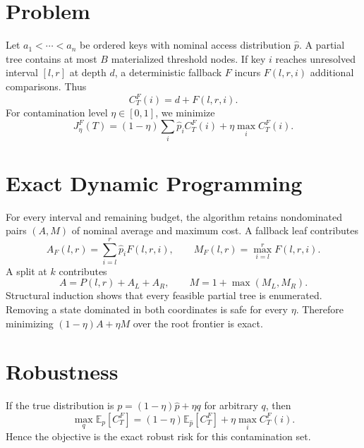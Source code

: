 \documentclass[10pt]{article}
\begin{document}
\begin{abstract}
The proof-carrying DSL adds canonical algebraic capability declarations,
retains every typed design even when ineligible, binds the selected runtime and
generated C++ to one digest, and independently regenerates the complete typed
grammar before accepting the embedded AutoIndex proof.
As a representation-aware synthesis case, CertiGap-H exactly selects
nonuniform two-level-prefix partitions for range sums and point updates. This
is exact optimization inside an explicitly programmed representation grammar,
not unconstrained discovery of a previously unknown data structure. Its
dynamic program and replay verifier use deterministic fixed-point score units.
For nonstationary operation streams, TrackingAutoIndex runs the causal Work
Function Algorithm over the feasible portfolio, pays explicit representation
migration cost, and reports exact ex-post regret against a dynamic-programming
$K$-switch oracle.
\end{abstract}

\section{Problem}
Let $a_1<\cdots<a_n$ be ordered keys with nominal access distribution
$\hat p$. A partial tree contains at most $B$ materialized threshold nodes.
If key $i$ reaches unresolved interval $[l,r]$ at depth $d$, a deterministic
fallback $F$ incurs $F(l,r,i)$ additional comparisons. Thus
\[
C_T^F(i)=d+F(l,r,i).
\]
For contamination level $\eta\in[0,1]$, we minimize
\[
J_\eta^F(T)=(1-\eta)\sum_i\hat p_iC_T^F(i)
             +\eta\max_i C_T^F(i).
\]

\section{Exact Dynamic Programming}
For every interval and remaining budget, the algorithm retains nondominated
pairs $(A,M)$ of nominal average and maximum cost. A fallback leaf contributes
\[
A_F(l,r)=\sum_{i=l}^r\hat p_iF(l,r,i),\qquad
M_F(l,r)=\max_{i=l}^r F(l,r,i).
\]
A split at $k$ contributes
\[
A=P(l,r)+A_L+A_R,\qquad M=1+\max(M_L,M_R).
\]
Structural induction shows that every feasible partial tree is enumerated.
Removing a state dominated in both coordinates is safe for every $\eta$.
Therefore minimizing $(1-\eta)A+\eta M$ over the root frontier is exact.

\section{Robustness}
If the true distribution is $p=(1-\eta)\hat p+\eta q$ for arbitrary $q$,
then
\[
\max_q\mathbb E_p[C_T^F]
=(1-\eta)\mathbb E_{\hat p}[C_T^F]+\eta\max_i C_T^F(i).
\]
Hence the objective is the exact robust risk for this contamination set.
\end{document}
